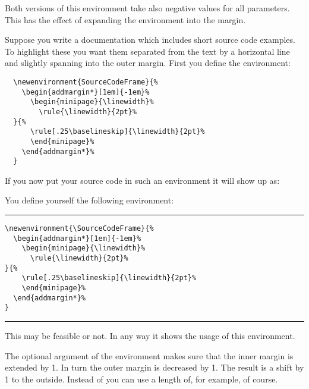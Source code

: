 Both versions of this environment take also negative values for all
parameters. This has the effect of expanding the environment into the
margin.
\begin{Example}
  Suppose you write a documentation which includes short source code
  examples. To highlight these you want them separated from the text
  by a horizontal line and slightly spanning into the outer
  margin. First you define the environment:
\begin{lstlisting}
  \newenvironment{SourceCodeFrame}{%
    \begin{addmargin*}[1em]{-1em}%
      \begin{minipage}{\linewidth}%
        \rule{\linewidth}{2pt}%
  }{%
      \rule[.25\baselineskip]{\linewidth}{2pt}%
      \end{minipage}%
    \end{addmargin*}%
  }
\end{lstlisting}
  If you now put your source code in such an environment it will show
  up as:
  \begin{ShowOutput}
  \newenvironment{SourceCodeFrame}{%
    \begin{addmargin*}[1em]{-1em}%
      \begin{minipage}{\linewidth}%
        \rule{\linewidth}{2pt}%
  }{%
      \rule[.25\baselineskip]{\linewidth}{2pt}%
      \end{minipage}%
    \end{addmargin*}%
  }
  You define yourself the following environment:
  \begin{SourceCodeFrame}
\begin{lstlisting}
\newenvironment{\SourceCodeFrame}{%
  \begin{addmargin*}[1em]{-1em}%
    \begin{minipage}{\linewidth}%
      \rule{\linewidth}{2pt}%
}{%
    \rule[.25\baselineskip]{\linewidth}{2pt}%
    \end{minipage}%
  \end{addmargin*}%
}
\end{lstlisting}
  \end{SourceCodeFrame}
  This may be feasible or not. In any way it shows the usage of this
  environment.
  \end{ShowOutput}
  The optional argument of the  environment
  makes sure that the inner margin is extended by 1. In turn
  the outer margin is decreased by 1. The result is a shift
  by 1 to the outside.  Instead of \PValue{1em} you can use a
  length of, for example,  of course.
\end{Example}
